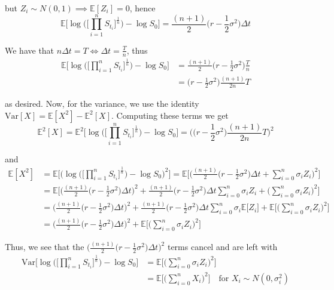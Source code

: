 \documentclass[12pt]{article}
\begin{document}
but $Z_i \sim N(0,1) \implies \mathbb E[Z_i] = 0$, hence
\begin{equation*}
	\mathbb E \Bigg[ \log \Bigg( \Bigg[ \prod^{n}_{i=1} S_{t_i} \Bigg]^{\frac{1}{n}} \Bigg) - \log S_0 \Bigg] = \frac{(n + 1)}{2} \Big(r - \frac{1}{2}\sigma^2 \Big)\Delta t 
\end{equation*}

We have that $n\Delta t = T \iff \Delta t = \frac{T}{n}$, thus
\begin{align*}
	\mathbb E \Bigg[ \log \Bigg( \Bigg[ \prod^{n}_{i=1} S_{t_i} \Bigg]^{\frac{1}{n}} \Bigg) - \log S_0 \Bigg] &= \frac{(n + 1)}{2} \Big(r - \frac{1}{2}\sigma^2 \Big)\frac{T}{n} \\
	&= \Big(r - \frac{1}{2}\sigma^2 \Big)\frac{(n + 1)}{2n}T
\end{align*}

as desired. Now, for the variance, we use the identity $\mathrm{Var}[X] = \mathbb E[X^2] - \mathbb E^2[X]$. Computing these terms we get
\begin{equation*}
	\mathbb E^2[X] = \mathbb E^2 \Bigg[ \log \Bigg( \Bigg[ \prod^{n}_{i=1} S_{t_i} \Bigg]^{\frac{1}{n}} \Bigg) - \log S_0 \Bigg] = \bigg( \Big(r - \frac{1}{2}\sigma^2 \Big)\frac{(n + 1)}{2n}T \bigg)^2
\end{equation*}

and
\begin{align*}
	\mathbb E[X^2] &= \mathbb E \Bigg[ \Bigg( \log \Bigg( \Bigg[ \prod^{n}_{i=1} S_{t_i} \Bigg]^{\frac{1}{n}} \Bigg) - \log S_0 \Bigg)^2 \Bigg] =  \mathbb E \Bigg[ \Bigg( \frac{(n + 1)}{2} \Big(r - \frac{1}{2}\sigma^2 \Big)\Delta t +  \sum^n_{i = 0} \sigma_iZ_i \Bigg)^2 \Bigg] \\
	&= \mathbb E\Bigg[ \bigg(\frac{(n + 1)}{2} \Big(r - \frac{1}{2}\sigma^2 \Big)\Delta t\bigg)^2 + \frac{(n + 1)}{2} \Big(r - \frac{1}{2}\sigma^2 \Big)\Delta t \sum^n_{i = 0} \sigma_iZ_i + \bigg(\sum^n_{i = 0} \sigma_iZ_i \bigg)^2 \Bigg] \\
	&= \bigg(\frac{(n + 1)}{2} \Big(r - \frac{1}{2}\sigma^2 \Big)\Delta t\bigg)^2 + \frac{(n + 1)}{2} \Big(r - \frac{1}{2}\sigma^2 \Big)\Delta t \sum^n_{i = 0}\sigma_i \mathbb E \big[Z_i\big] + \mathbb E \Bigg[ \bigg(\sum^n_{i = 0} \sigma_iZ_i \bigg)^2 \Bigg] \\
	&= \bigg(\frac{(n + 1)}{2} \Big(r - \frac{1}{2}\sigma^2 \Big)\Delta t\bigg)^2 + \mathbb E \Bigg[ \bigg(\sum^n_{i = 0} \sigma_iZ_i \bigg)^2 \Bigg]	
\end{align*}

Thus, we see that the $\Big(\frac{(n + 1)}{2} \big(r - \frac{1}{2}\sigma^2 \big)\Delta t\Big)^2$ terms cancel and are left with
\begin{align*}
	\mathrm{Var} \Bigg[ \log \Bigg( \Bigg[ \prod^{n}_{i=1} S_{t_i} \Bigg]^{\frac{1}{n}} \Bigg) - \log S_0 \Bigg] &= \mathbb E \Bigg[ \bigg(\sum^n_{i = 0} \sigma_iZ_i \bigg)^2 \Bigg] \\
	&= \mathbb E \Bigg[ \bigg(\sum^n_{i = 0} X_i \bigg)^2 \Bigg] \quad \text{for } X_i \sim N(0, \sigma_i^2)
\end{align*}
\end{document}

